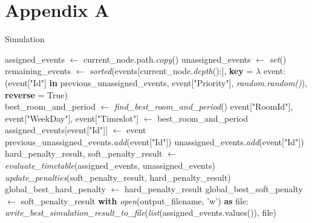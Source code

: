 
\chapter*{Appendix A} %

\label{AppendixA} %

\begin{algorithm}
\caption{Simulation}\label{simulation}
\begin{algorithmic}[1]
    \State assigned\_events $\gets$ current\_node.path.\textit{copy}()
    \State unassigned\_events $\gets$ \textit{set}()
    \State remaining\_events $\gets$ \textit{sorted}(events[current\_node.\textit{depth}():], 
    \Statex \hspace{3cm} \textbf{key} = $\lambda$ event: (event["Id"] \textbf{in} previous\_unassigned\_events, event["Priority"], \textit{random.random()}), 
    \Statex \hspace{3cm} \textbf{reverse} = True)
    \\
        \State best\_room\_and\_period $\gets$ \textit{find\_best\_room\_and\_period}()
            \State event["RoomId"], event["WeekDay"], event["Timeslot"] $\gets$ best\_room\_and\_period
            \State assigned\_events[event["Id"]] $\gets$ event
        \Else
            \State previous\_unassigned\_events.\textit{add}(event["Id"])
            \State unassigned\_events.\textit{add}(event["Id"])
        \EndIf
    \EndFor
    \\
    \State hard\_penalty\_result, soft\_penalty\_result $\gets$ \textit{evaluate\_timetable}(assigned\_events, unassigned\_events)
    \\
    \State \textit{update\_penalties}(soft\_penalty\_result, hard\_penalty\_result)
    \\
        \State global\_best\_hard\_penalty $\gets$ hard\_penalty\_result
        \State global\_best\_soft\_penalty $\gets$ soft\_penalty\_result
        \State \textbf{with} \textit{open}(output\_filename, 'w') \textbf{as} file:
            \State \hspace{1cm} \textit{write\_best\_simulation\_result\_to\_file}(\textit{list}(assigned\_events.values()), file)

\end{algorithmic}
\end{algorithm}
